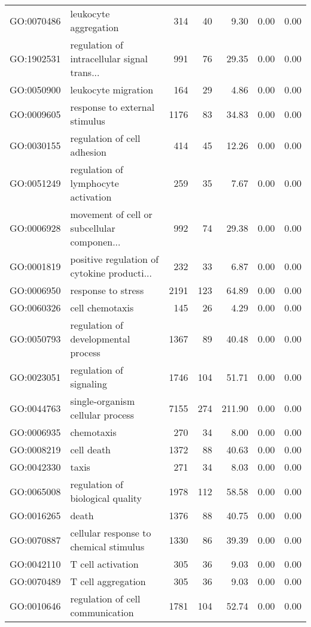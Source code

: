 \begin{table}[ht]
\begin{tabular}{llrrrrr}
  GO:0070486 & leukocyte aggregation & 314 &  40 & 9.30 & 0.00 & 0.00 \\ 
  GO:1902531 & regulation of intracellular signal trans... & 991 &  76 & 29.35 & 0.00 & 0.00 \\ 
  GO:0050900 & leukocyte migration & 164 &  29 & 4.86 & 0.00 & 0.00 \\ 
  GO:0009605 & response to external stimulus & 1176 &  83 & 34.83 & 0.00 & 0.00 \\ 
  GO:0030155 & regulation of cell adhesion & 414 &  45 & 12.26 & 0.00 & 0.00 \\ 
  GO:0051249 & regulation of lymphocyte activation & 259 &  35 & 7.67 & 0.00 & 0.00 \\ 
  GO:0006928 & movement of cell or subcellular componen... & 992 &  74 & 29.38 & 0.00 & 0.00 \\ 
  GO:0001819 & positive regulation of cytokine producti... & 232 &  33 & 6.87 & 0.00 & 0.00 \\ 
  GO:0006950 & response to stress & 2191 & 123 & 64.89 & 0.00 & 0.00 \\ 
  GO:0060326 & cell chemotaxis & 145 &  26 & 4.29 & 0.00 & 0.00 \\ 
  GO:0050793 & regulation of developmental process & 1367 &  89 & 40.48 & 0.00 & 0.00 \\ 
  GO:0023051 & regulation of signaling & 1746 & 104 & 51.71 & 0.00 & 0.00 \\ 
  GO:0044763 & single-organism cellular process & 7155 & 274 & 211.90 & 0.00 & 0.00 \\ 
  GO:0006935 & chemotaxis & 270 &  34 & 8.00 & 0.00 & 0.00 \\ 
  GO:0008219 & cell death & 1372 &  88 & 40.63 & 0.00 & 0.00 \\ 
  GO:0042330 & taxis & 271 &  34 & 8.03 & 0.00 & 0.00 \\ 
  GO:0065008 & regulation of biological quality & 1978 & 112 & 58.58 & 0.00 & 0.00 \\ 
  GO:0016265 & death & 1376 &  88 & 40.75 & 0.00 & 0.00 \\ 
  GO:0070887 & cellular response to chemical stimulus & 1330 &  86 & 39.39 & 0.00 & 0.00 \\ 
  GO:0042110 & T cell activation & 305 &  36 & 9.03 & 0.00 & 0.00 \\ 
  GO:0070489 & T cell aggregation & 305 &  36 & 9.03 & 0.00 & 0.00 \\ 
  GO:0010646 & regulation of cell communication & 1781 & 104 & 52.74 & 0.00 & 0.00 \\ 

\end{tabular}
\end{table}
